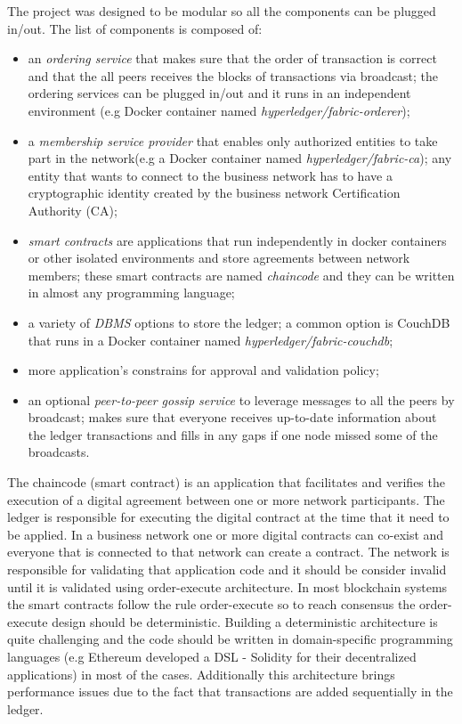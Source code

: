 The project was designed to be modular so all the components can be plugged in/out. The list of components is composed of:
\begin{itemize}
	\item an \emph{ordering service} that makes sure that the order of transaction is correct and that the all peers receives the blocks of transactions via broadcast; the ordering services can be plugged in/out and it runs in an independent environment (e.g Docker container named \emph{hyperledger/fabric-orderer});
	\item a \emph{membership service provider} that enables only authorized entities to take part in the network(e.g a Docker container named \emph{hyperledger/fabric-ca}); any entity that wants to connect to the business network has to have a cryptographic identity created by the business network Certification Authority (CA);
	\item \emph{smart contracts} are applications that run independently in docker containers or other isolated environments and store agreements between network members; these smart contracts are named \emph{chaincode} and they can be written in almost any programming language;
	\item a variety of \emph{DBMS} options to store the ledger; a common option is CouchDB that runs in a Docker container named \emph{hyperledger/fabric-couchdb};
	\item more application's constrains for approval and validation policy;
	\item an optional \emph{peer-to-peer gossip service} to leverage messages to all the peers by broadcast; makes sure that everyone receives up-to-date information about the ledger transactions and fills in any gaps if one node missed some of the broadcasts.	
\end{itemize}

The chaincode (smart contract) is an application that facilitates and verifies the execution of a digital agreement between one or more network participants. The ledger is responsible for executing the digital contract at the time that it need to be applied. In a business network one or more digital contracts can co-exist and everyone that is connected to that network can create a contract. The network is responsible for validating that application code and it should be consider invalid until it is validated using order-execute architecture. In most blockchain systems the smart contracts follow the rule order-execute so to reach consensus the order-execute design should be deterministic. Building a deterministic architecture  is quite challenging and the code should be written in domain-specific programming languages (e.g Ethereum developed a DSL - Solidity for their decentralized applications) in most of the cases.
Additionally this architecture brings performance issues due to the fact that transactions are added sequentially in the ledger.


